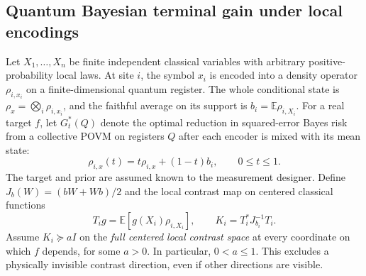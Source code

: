 \documentclass[11pt,letterpaper]{article}
\theoremstyle{definition}
\newcommand{\E}{\mathbb E}
\begin{document}
\subsection{Quantum Bayesian terminal gain under local encodings}
Let $X_1,\ldots,X_n$ be finite independent classical variables with
arbitrary positive-probability local laws. At site $i$, the symbol
$x_i$ is encoded into a density operator $\rho_{i,x_i}$ on a
finite-dimensional quantum register. The whole conditional state is
$\rho_x=\bigotimes_i\rho_{i,x_i}$, and the faithful average on its
support is $b_i=\E\rho_{i,X_i}$. For a real target $f$, let
$G_t^*(Q)$ denote the optimal reduction in squared-error Bayes risk
from a collective POVM on registers $Q$ after each encoder is
mixed with its mean state:
\[\rho_{i,x}(t)=t\rho_{i,x}+(1-t)b_i,\qquad 0\le t\le1.\]
The target and prior are assumed known to the measurement designer.
Define $J_b(W)=(bW+Wb)/2$ and the local contrast map on centered
classical functions
\[
T_i g=\E[g(X_i)\rho_{i,X_i}],\qquad
K_i=T_i^*J_{b_i}^{-1}T_i.
\]
Assume $K_i\succeq a I$ on the \emph{full centered local contrast space} at every coordinate on which $f$ depends, for some $a>0$. In particular, $0<a\le1$. This excludes a physically invisible contrast direction, even if other directions are visible.
\end{document}
